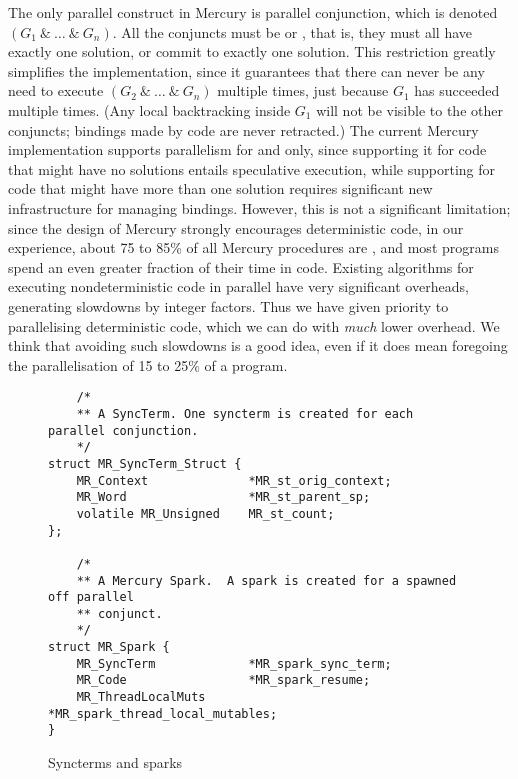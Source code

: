 The only parallel construct in Mercury is parallel conjunction,
which is denoted $(G_1~\&~\ldots~\&~G_n)$.
All the conjuncts must be \ddet or \dccmulti,
that is, they must all have exactly one solution,
or commit to exactly one solution.
This restriction greatly simplifies the implementation,
since it guarantees that there can never be any need
to execute $(G_2~\&~\ldots~\&~G_n)$ multiple times,
just because $G_1$ has succeeded multiple times.
(Any local backtracking inside $G_1$ will not be visible to the other conjuncts;
bindings made by \ddet code are never retracted.)
The current Mercury implementation supports parallelism for \ddet and
\dccmulti only,
since supporting it for code that might have no solutions
entails speculative execution,
while supporting for code that might have more than one solution
requires significant new infrastructure for managing bindings.
However, this is not a significant limitation;
since the design of Mercury strongly encourages deterministic code,
in our experience, about 75 to 85\% of all Mercury procedures are \ddet,
and most programs spend an even greater fraction of their time in \ddet code.
Existing algorithms for executing nondeterministic code in parallel
have very significant overheads, generating slowdowns by integer factors.
Thus we have given priority to parallelising deterministic code,
which we can do with \emph{much} lower overhead.
We think that avoiding such slowdowns is a good idea,
even if it does mean foregoing the parallelisation of 15 to 25\% of a program.

\begin{figure}
\begin{verbatim}
    /*
    ** A SyncTerm. One syncterm is created for each parallel conjunction.
    */
struct MR_SyncTerm_Struct {
    MR_Context              *MR_st_orig_context;
    MR_Word                 *MR_st_parent_sp;
    volatile MR_Unsigned    MR_st_count;
};

    /*
    ** A Mercury Spark.  A spark is created for a spawned off parallel
    ** conjunct.
    */
struct MR_Spark {
    MR_SyncTerm             *MR_spark_sync_term;
    MR_Code                 *MR_spark_resume;
    MR_ThreadLocalMuts      *MR_spark_thread_local_mutables;
}
\end{verbatim}
\caption{Syncterms and sparks}
\label{fig:spark_and_syncterm}
\end{figure}


